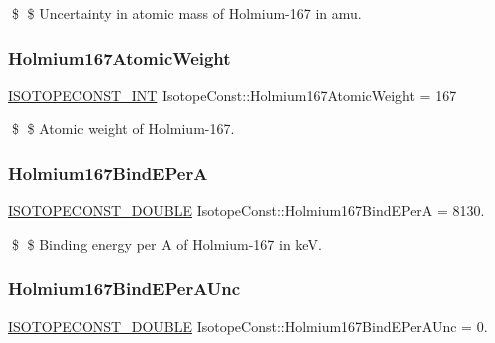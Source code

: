 \$ \$ Uncertainty in atomic mass of Holmium-\/167 in amu. \mbox{\label{group___isotope_const-_holmium-_ho167_ga2782f96d8a4fa9fd8e56e6d29b1badde}} 
\subsubsection{\texorpdfstring{Holmium167\+Atomic\+Weight}{Holmium167AtomicWeight}}
{\footnotesize\ttfamily \mbox{\hyperlink{group___isotope_const-_macros_ga5f18360b3e99483a35c32d789e62621c}{I\+S\+O\+T\+O\+P\+E\+C\+O\+N\+S\+T\+\_\+\+I\+NT}} Isotope\+Const\+::\+Holmium167\+Atomic\+Weight = 167}

\$ \$ Atomic weight of Holmium-\/167. \mbox{\label{group___isotope_const-_holmium-_ho167_ga78df2eb526cde6575f34e2ad77a19c6f}} 
\subsubsection{\texorpdfstring{Holmium167\+Bind\+E\+PerA}{Holmium167BindEPerA}}
{\footnotesize\ttfamily \mbox{\hyperlink{group___isotope_const-_macros_ga8f45a7272ce02c0b4c65c44636ed719a}{I\+S\+O\+T\+O\+P\+E\+C\+O\+N\+S\+T\+\_\+\+D\+O\+U\+B\+LE}} Isotope\+Const\+::\+Holmium167\+Bind\+E\+PerA = 8130.}

\$ \$ Binding energy per A of Holmium-\/167 in keV. \mbox{\label{group___isotope_const-_holmium-_ho167_ga5f39b6b70655fe6a05ee796bcdf82a7f}} 
\subsubsection{\texorpdfstring{Holmium167\+Bind\+E\+Per\+A\+Unc}{Holmium167BindEPerAUnc}}
{\footnotesize\ttfamily \mbox{\hyperlink{group___isotope_const-_macros_ga8f45a7272ce02c0b4c65c44636ed719a}{I\+S\+O\+T\+O\+P\+E\+C\+O\+N\+S\+T\+\_\+\+D\+O\+U\+B\+LE}} Isotope\+Const\+::\+Holmium167\+Bind\+E\+Per\+A\+Unc = 0.}

